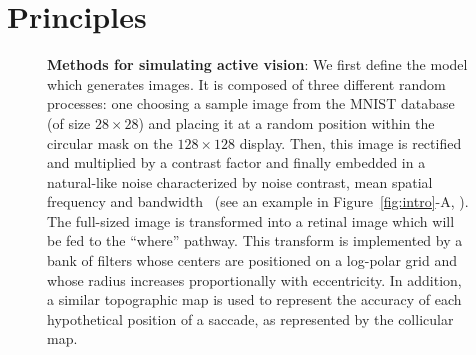 \section{Principles}
\label{sec:principles}
\begin{figure}[t!]%
\ICANN
\else
{}
\fi
\caption{%
{\bf Methods for simulating active vision}:
\A We first define the model which generates images. It is composed of three different random processes: one choosing a sample image from the MNIST database (of size $28\times 28$) and placing it at a random position within the circular mask on the $128\times 128$ display. Then, this image is rectified and multiplied by a contrast factor and finally embedded in a natural-like noise characterized by noise contrast, mean spatial frequency and bandwidth~\citep{Sanz12} (see an example in  Figure~\ref{fig:intro}-A,  \DIS ). %
\B The full-sized image is transformed into a retinal image which will be fed to the ``where'' pathway. This transform is implemented by a bank of filters whose centers are positioned on a log-polar grid and whose radius increases proportionally with eccentricity. In addition, a similar topographic map is used to represent the accuracy of each hypothetical position of a saccade, as represented by the collicular map. %
}
\end{figure}
